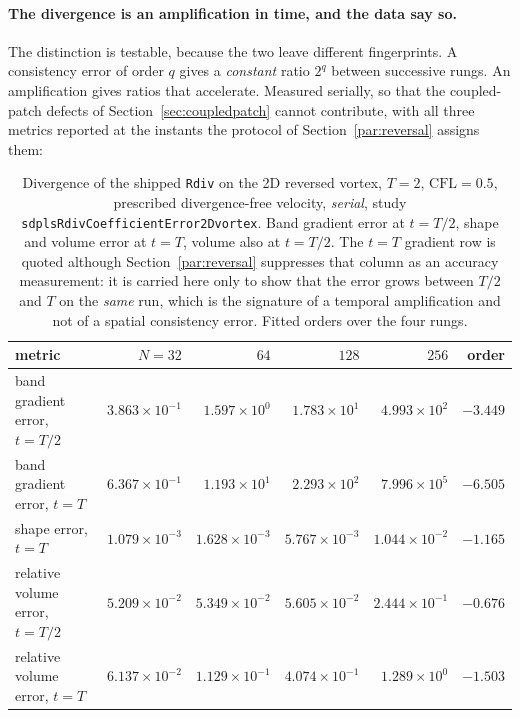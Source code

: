 \documentclass[preprint,3p,11pt]{elsarticle}
\begin{document}
\paragraph{The divergence is an amplification in time, and the data say so.} The
distinction is testable, because the two leave different fingerprints. A
consistency error of order $q$ gives a \emph{constant} ratio $2^{q}$ between
successive rungs. An amplification gives ratios that accelerate. Measured
serially, so that the coupled-patch defects of Section~\ref{sec:coupledpatch}
cannot contribute, with all three metrics reported at the instants the protocol of
Section~\ref{par:reversal} assigns them:

\begin{table}[htbp]
\centering
\caption{Divergence of the shipped \texttt{Rdiv} on the 2D reversed vortex,
$T=2$, $\mathrm{CFL}=0.5$, prescribed divergence-free velocity, \emph{serial},
study \texttt{sdplsRdivCoefficientError2Dvortex}. Band gradient error at $t=T/2$,
shape and volume error at $t=T$, volume also at $t=T/2$. The $t=T$ gradient row is
quoted although Section~\ref{par:reversal} suppresses that column as an accuracy
measurement: it is carried here only to show that the error grows between $T/2$
and $T$ on the \emph{same} run, which is the signature of a temporal amplification
and not of a spatial consistency error. Fitted orders over the four rungs.}
\label{tab:rdiv-serial}
\small
\begin{tabular}{lrrrrr}
\toprule
metric & $N=32$ & $64$ & $128$ & $256$ & order \\
\midrule
band gradient error, $t=T/2$ & $3.863\times10^{-1}$ & $1.597\times10^{0}$ & $1.783\times10^{1}$ & $4.993\times10^{2}$ & $-3.449$ \\
band gradient error, $t=T$   & $6.367\times10^{-1}$ & $1.193\times10^{1}$ & $2.293\times10^{2}$ & $7.996\times10^{5}$ & $-6.505$ \\
shape error, $t=T$           & $1.079\times10^{-3}$ & $1.628\times10^{-3}$ & $5.767\times10^{-3}$ & $1.044\times10^{-2}$ & $-1.165$ \\
relative volume error, $t=T/2$ & $5.209\times10^{-2}$ & $5.349\times10^{-2}$ & $5.605\times10^{-2}$ & $2.444\times10^{-1}$ & $-0.676$ \\
relative volume error, $t=T$   & $6.137\times10^{-2}$ & $1.129\times10^{-1}$ & $4.074\times10^{-1}$ & $1.289\times10^{0}$ & $-1.503$ \\
\bottomrule
\end{tabular}
\end{table}
\end{document}
